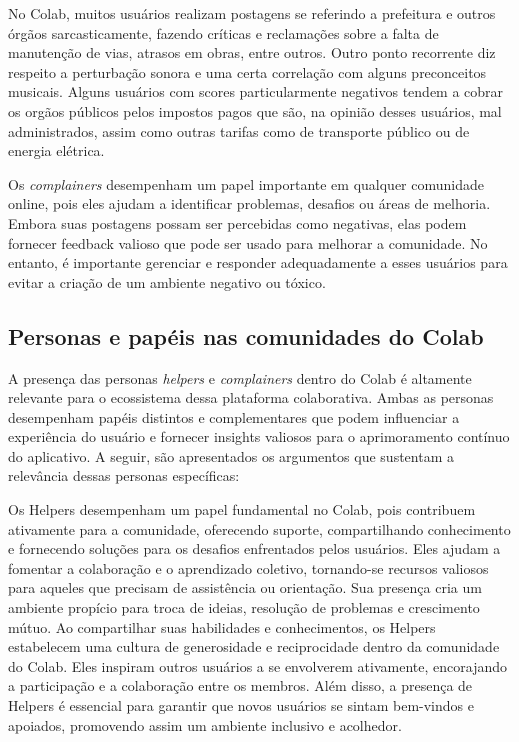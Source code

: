 No Colab, muitos usuários realizam postagens se referindo a prefeitura e outros órgãos sarcasticamente, fazendo críticas e reclamações sobre a falta de manutenção de vias, atrasos em obras, entre outros. Outro ponto recorrente diz respeito a perturbação sonora e uma certa correlação com alguns preconceitos musicais. Alguns usuários com scores particularmente negativos tendem a cobrar os orgãos públicos pelos impostos pagos que são, na opinião desses usuários, mal administrados, assim como outras tarifas como de transporte público ou de energia elétrica.

Os \textit{complainers} desempenham um papel importante em qualquer comunidade online, pois eles ajudam a identificar problemas, desafios ou áreas de melhoria. Embora suas postagens possam ser percebidas como negativas, elas podem fornecer feedback valioso que pode ser usado para melhorar a comunidade. No entanto, é importante gerenciar e responder adequadamente a esses usuários para evitar a criação de um ambiente negativo ou tóxico.

\subsection{Personas e papéis nas comunidades do Colab}

A presença das personas \textit{helpers} e \textit{complainers} dentro do Colab é altamente relevante para o ecossistema dessa plataforma colaborativa. Ambas as personas desempenham papéis distintos e complementares que podem influenciar a experiência do usuário e fornecer insights valiosos para o aprimoramento contínuo do aplicativo. A seguir, são apresentados os argumentos que sustentam a relevância dessas personas específicas:

Os Helpers desempenham um papel fundamental no Colab, pois contribuem ativamente para a comunidade, oferecendo suporte, compartilhando conhecimento e fornecendo soluções para os desafios enfrentados pelos usuários. Eles ajudam a fomentar a colaboração e o aprendizado coletivo, tornando-se recursos valiosos para aqueles que precisam de assistência ou orientação. Sua presença cria um ambiente propício para troca de ideias, resolução de problemas e crescimento mútuo. Ao compartilhar suas habilidades e conhecimentos, os Helpers estabelecem uma cultura de generosidade e reciprocidade dentro da comunidade do Colab. Eles inspiram outros usuários a se envolverem ativamente, encorajando a participação e a colaboração entre os membros. Além disso, a presença de Helpers é essencial para garantir que novos usuários se sintam bem-vindos e apoiados, promovendo assim um ambiente inclusivo e acolhedor.

